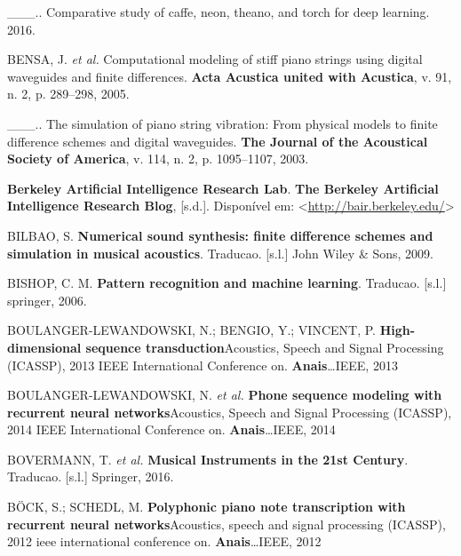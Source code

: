 \documentclass[]{article}
\begin{document}
\leavevmode\hypertarget{ref-bahrampour2016comparative}{}%
\_\_\_.. Comparative study of caffe, neon, theano, and torch for deep
learning. 2016.

\leavevmode\hypertarget{ref-bensa2005computational}{}%
BENSA, J. \emph{et al.} Computational modeling of stiff piano strings
using digital waveguides and finite differences. \textbf{Acta Acustica
united with Acustica}, v. 91, n. 2, p. 289--298, 2005.

\leavevmode\hypertarget{ref-bensa2003simulation}{}%
\_\_\_.. The simulation of piano string vibration: From physical models
to finite difference schemes and digital waveguides. \textbf{The Journal
of the Acoustical Society of America}, v. 114, n. 2, p. 1095--1107,
2003.

\leavevmode\hypertarget{ref-bair}{}%
\textbf{Berkeley Artificial Intelligence Research Lab}. \textbf{The
Berkeley Artificial Intelligence Research Blog}, {[}s.d.{]}. Disponível
em: \textless{}\url{http://bair.berkeley.edu/}\textgreater{}

\leavevmode\hypertarget{ref-bilbao2009numerical}{}%
BILBAO, S. \textbf{Numerical sound synthesis: finite difference schemes
and simulation in musical acoustics}. Traducao. {[}s.l.{]} John Wiley \&
Sons, 2009.

\leavevmode\hypertarget{ref-bishop06}{}%
BISHOP, C. M. \textbf{Pattern recognition and machine learning}.
Traducao. {[}s.l.{]} springer, 2006.

\leavevmode\hypertarget{ref-boulanger2013high}{}%
BOULANGER-LEWANDOWSKI, N.; BENGIO, Y.; VINCENT, P.
\textbf{High-dimensional sequence transduction}Acoustics, Speech and
Signal Processing (ICASSP), 2013 IEEE International Conference on.
\textbf{Anais}\ldots{}IEEE, 2013

\leavevmode\hypertarget{ref-boulanger2014phone}{}%
BOULANGER-LEWANDOWSKI, N. \emph{et al.} \textbf{Phone sequence modeling
with recurrent neural networks}Acoustics, Speech and Signal Processing
(ICASSP), 2014 IEEE International Conference on.
\textbf{Anais}\ldots{}IEEE, 2014

\leavevmode\hypertarget{ref-bovermann2016musical}{}%
BOVERMANN, T. \emph{et al.} \textbf{Musical Instruments in the 21st
Century}. Traducao. {[}s.l.{]} Springer, 2016.

\leavevmode\hypertarget{ref-bock2012polyphonic}{}%
BÖCK, S.; SCHEDL, M. \textbf{Polyphonic piano note transcription with
recurrent neural networks}Acoustics, speech and signal processing
(ICASSP), 2012 ieee international conference on.
\textbf{Anais}\ldots{}IEEE, 2012
\end{document}
